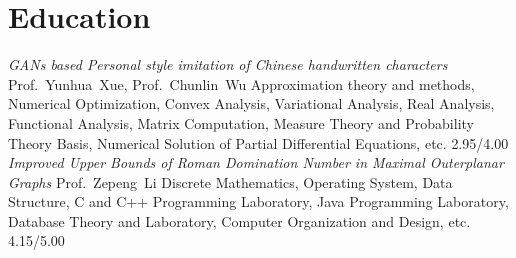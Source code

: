 \documentclass[11pt,a4paper, final]{moderncv}
\newcommand{\spacesubsection}{\vspace{0.2cm}}
\begin{document}
\section{\textbf{Education}}
	{\emph{GANs based Personal style imitation of Chinese handwritten characters}}
	{Prof.~Yunhua~Xue, Prof.~Chunlin~Wu}
	{Approximation theory and methods, Numerical Optimization, Convex Analysis, Variational Analysis, Real Analysis, Functional Analysis, 
	Matrix Computation, Measure Theory and Probability Theory Basis, Numerical Solution of Partial Differential Equations, etc.}
	{2.95/4.00}
	{\emph{Improved Upper Bounds of Roman Domination Number in Maximal Outerplanar Graphs}}
	{Prof.~Zepeng~Li}
	{Discrete Mathematics, Operating System, Data Structure, C and C++ Programming Laboratory, 
	Java Programming Laboratory, Database Theory and Laboratory, Computer Organization and Design, etc.}
	{4.15/5.00}
\end{document}
